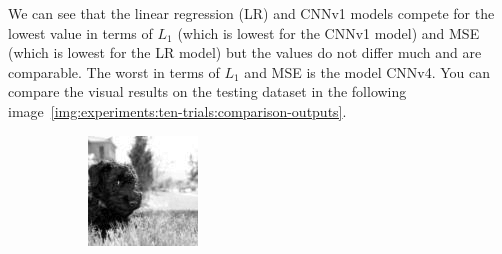 We can see that the linear regression (LR) and CNNv1 models compete for the lowest value in terms of $L_1$ (which is lowest for the CNNv1 model) and MSE (which is lowest for the LR model) but the values do not differ much and are comparable. The worst in terms of $L_1$ and MSE is the model CNNv4. You can compare the visual results on the testing dataset in the following image~\ref{img:experiments:ten-trials:comparison-outputs}.

\begin{figure}[H]\centering

  \begin{subfigure}[t]{0.15\textwidth}
    \centering
    \includegraphics[width=\linewidth]{img/ten-trials/stimulus_1.png}
  \end{subfigure}
  \begin{subfigure}[t]{0.15\textwidth}
    \centering

\end{subfigure}
\end{figure}
